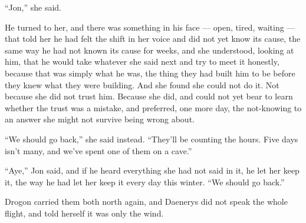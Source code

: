 “Jon,” she said.

He turned to her, and there was something in his face — open, tired, waiting — that told her he had felt the shift in her voice and did not yet know its cause, the same way he had not known its cause for weeks, and she understood, looking at him, that he would take whatever she said next and try to meet it honestly, because that was simply what he was, the thing they had built him to be before they knew what they were building. And she found she could not do it. Not because she did not trust him. Because she did, and could not yet bear to learn whether the trust was a mistake, and preferred, one more day, the not-knowing to an answer she might not survive being wrong about.

“We should go back,” she said instead. “They’ll be counting the hours. Five days isn’t many, and we’ve spent one of them on a cave.”

“Aye,” Jon said, and if he heard everything she had not said in it, he let her keep it, the way he had let her keep it every day this winter. “We should go back.”

Drogon carried them both north again, and Daenerys did not speak the whole flight, and told herself it was only the wind.